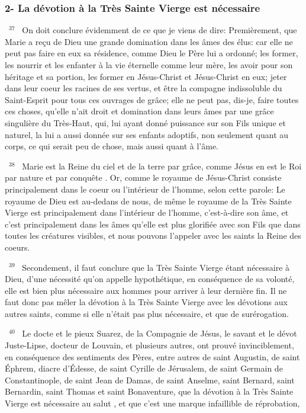 \documentclass[paper=a5,pagesize=pdftex,fontsize=15pt,headinclude=on,twoside=off]{scrbook}
\newcommand{\negphantom}[1]{\settowidth{\dimen0}{#1}\hspace*{-\dimen0}}
\newcommand{\versenb}[1]{\par \vspace{10pt}~\negphantom{~${}^{#1}$~}${}^{#1}$~}
\begin{document}
\subsubsection{2- La dévotion à la Très Sainte Vierge est nécessaire}
\versenb{37} On doit conclure évidemment de ce que je viens de dire:
Premièrement, que Marie a reçu de Dieu une grande domination dans les âmes des élus: car elle ne peut pas faire
en eux sa résidence, comme Dieu le Père lui a ordonné; les former, les nourrir et les enfanter à la vie éternelle
comme leur mère, les avoir pour son héritage et sa portion, les former en Jésus-Christ et Jésus-Christ en eux; jeter
dans leur coeur les racines de ses vertus, et être la compagne indissoluble du Saint-Esprit pour tous ces ouvrages
de grâce; elle ne peut pas, dis-je, faire toutes ces choses, qu'elle n'ait droit et domination dans leurs âmes par une
grâce singulière du Très-Haut, qui, lui ayant donné puissance sur son Fils unique et naturel, la lui a aussi donnée
sur ses enfants adoptifs, non seulement quant au corps, ce qui serait peu de chose, mais aussi quant à l'âme.
\versenb{38} Marie est la Reine du ciel et de la terre par grâce, comme Jésus en est le Roi par nature et par conquête . Or,
comme le royaume de Jésus-Christ consiste principalement dans le coeur ou l'intérieur de l'homme, selon cette
parole: Le royaume de Dieu est au-dedans de nous, de même le royaume de la Très Sainte Vierge est
principalement dans l'intérieur de l'homme, c'est-à-dire son âme, et c'est principalement dans les âmes qu'elle est
plus glorifiée avec son Fils que dans toutes les créatures visibles, et nous pouvons l'appeler avec les saints la
Reine des coeurs.
\versenb{39} Secondement, il faut conclure que la Très Sainte Vierge étant nécessaire à Dieu, d'une nécessité qu'on
appelle hypothétique, en conséquence de sa volonté, elle est bien plus nécessaire aux hommes pour arriver à leur
dernière fin. Il ne faut donc pas mêler la dévotion à la Très Sainte Vierge avec les dévotions aux autres saints,
comme si elle n'était pas plus nécessaire, et que de surérogation.
\versenb{40} Le docte et le pieux Suarez, de la Compagnie de Jésus, le savant et le dévot Juste-Lipse, docteur de Louvain,
et plusieurs autres, ont prouvé invinciblement, en conséquence des sentiments des Pères, entre autres de saint
Augustin, de saint Éphrem, diacre d'Édesse, de saint Cyrille de Jérusalem, de saint Germain de Constantinople,
de saint Jean de Damas, de saint Anselme, saint Bernard, saint Bernardin, saint Thomas et saint Bonaventure,
que la dévotion à la Très Sainte Vierge est nécessaire au salut , et que c'est une marque infaillible de réprobation,
\end{document}
